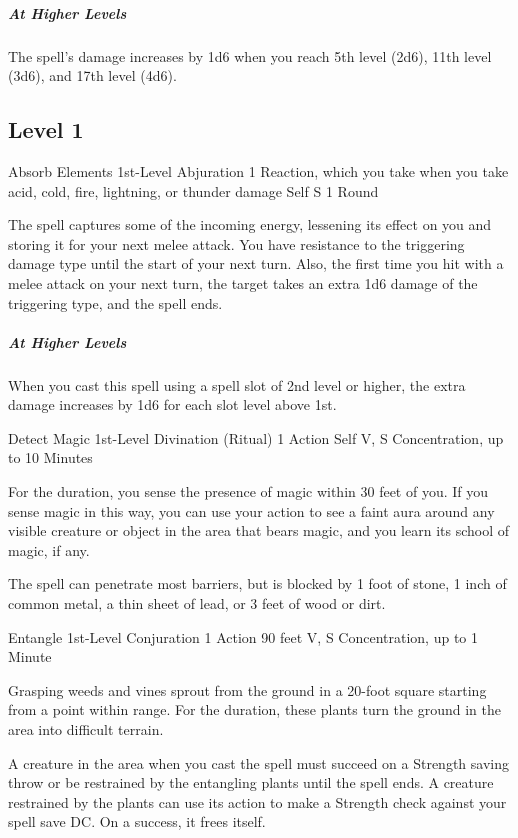 {\subparagraph*{At Higher Levels} The spell’s damage increases by 1d6 when you reach 5th level (2d6), 11th level (3d6), and 17th level (4d6).

\subsection*{Level 1}

\DndSpellHeader
  {Absorb Elements}
  {1st-Level Abjuration}
  {1 Reaction, which you take when you take acid, cold, fire, lightning, or thunder damage}
  {Self}
  {S}
  {1 Round}

The spell captures some of the incoming energy, lessening its effect on you and storing it for your next melee attack. You have resistance to the triggering damage type until the start of your next turn. Also, the first time you hit with a melee attack on your next turn, the target takes an extra 1d6 damage of the triggering type, and the spell ends.

\subparagraph*{At Higher Levels} When you cast this spell using a spell slot of 2nd level or higher, the extra damage increases by 1d6 for each slot level above 1st.

\DndSpellHeader
  {Detect Magic}
  {1st-Level Divination (Ritual)}
  {1 Action}
  {Self}
  {V, S}
  {Concentration, up to 10 Minutes}

For the duration, you sense the presence of magic within 30 feet of you. If you sense magic in this way, you can use your action to see a faint aura around any visible creature or object in the area that bears magic, and you learn its school of magic, if any.

The spell can penetrate most barriers, but is blocked by 1 foot of stone, 1 inch of common metal, a thin sheet of lead, or 3 feet of wood or dirt.

\DndSpellHeader
  {Entangle}
  {1st-Level Conjuration}
  {1 Action}
  {90 feet}
  {V, S}
  {Concentration, up to 1 Minute}

Grasping weeds and vines sprout from the ground in a 20-foot square starting from a point within range. For the duration, these plants turn the ground in the area into difficult terrain.

A creature in the area when you cast the spell must succeed on a Strength saving throw or be restrained by the entangling plants until the spell ends. A creature restrained by the plants can use its action to make a Strength check against your spell save DC. On a success, it frees itself.

}
